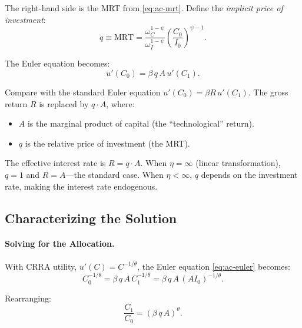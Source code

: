 The right-hand side is the MRT from \cref{eq:ac-mrt}. Define the \emph{implicit price of investment}:
\begin{equation}
q \equiv \text{MRT} = \frac{\omega_C^{1-\psi}}{\omega_I^{1-\psi}} \left( \frac{C_0}{I_0} \right)^{\psi-1}.
\label{eq:ac-q-def}
\end{equation}

The Euler equation becomes:
\begin{equation}
\boxed{u'(C_0) = \beta \, q \, A \, u'(C_1).}
\label{eq:ac-euler}
\end{equation}

\begin{calloutimportant}
Compare with the standard Euler equation $u'(C_0) = \beta R \, u'(C_1)$. The gross return $R$ is replaced by $q \cdot A$, where:
\begin{itemize}[nosep]
\item $A$ is the marginal product of capital (the ``technological'' return).
\item $q$ is the relative price of investment (the MRT).
\end{itemize}

The effective interest rate is $R = q \cdot A$. When $\eta = \infty$ (linear transformation), $q = 1$ and $R = A$---the standard case. When $\eta < \infty$, $q$ depends on the investment rate, making the interest rate endogenous.
\end{calloutimportant}

\subsection{Characterizing the Solution}
\label{subsec:ac-solution}

\paragraph{Solving for the Allocation.}
With CRRA utility, $u'(C) = C^{-1/\theta}$, the Euler equation \cref{eq:ac-euler} becomes:
\begin{equation}
C_0^{-1/\theta} = \beta \, q \, A \, C_1^{-1/\theta} = \beta \, q \, A \, (A I_0)^{-1/\theta}.
\label{eq:ac-euler-crra}
\end{equation}

Rearranging:
\begin{equation}
\frac{C_1}{C_0} = (\beta \, q \, A)^{\theta}.
\label{eq:ac-consumption-ratio}
\end{equation}

